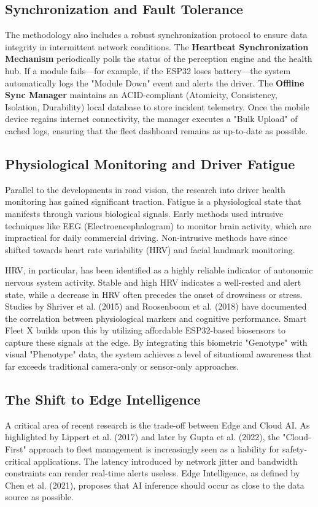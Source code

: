 \documentclass[conference]{IEEEtran}
\begin{document}
\subsection{Synchronization and Fault Tolerance}
The methodology also includes a robust synchronization protocol to ensure data integrity in intermittent network conditions. The \textbf{Heartbeat Synchronization Mechanism} periodically polls the status of the perception engine and the health hub. If a module fails—for example, if the ESP32 loses battery—the system automatically logs the "Module Down" event and alerts the driver. The \textbf{Offline Sync Manager} maintains an ACID-compliant (Atomicity, Consistency, Isolation, Durability) local database to store incident telemetry. Once the mobile device regains internet connectivity, the manager executes a "Bulk Upload" of cached logs, ensuring that the fleet dashboard remains as up-to-date as possible.

\subsection{Physiological Monitoring and Driver Fatigue}
Parallel to the developments in road vision, the research into driver health monitoring has gained significant traction. Fatigue is a physiological state that manifests through various biological signals. Early methods used intrusive techniques like EEG (Electroencephalogram) to monitor brain activity, which are impractical for daily commercial driving. Non-intrusive methods have since shifted towards heart rate variability (HRV) and facial landmark monitoring.

HRV, in particular, has been identified as a highly reliable indicator of autonomic nervous system activity. Stable and high HRV indicates a well-rested and alert state, while a decrease in HRV often precedes the onset of drowsiness or stress. Studies by Shriver et al. (2015) and Roosenboom et al. (2018) have documented the correlation between physiological markers and cognitive performance. Smart Fleet X builds upon this by utilizing affordable ESP32-based biosensors to capture these signals at the edge. By integrating this biometric "Genotype" with visual "Phenotype" data, the system achieves a level of situational awareness that far exceeds traditional camera-only or sensor-only approaches.

\subsection{The Shift to Edge Intelligence}
A critical area of recent research is the trade-off between Edge and Cloud AI. As highlighted by Lippert et al. (2017) and later by Gupta et al. (2022), the "Cloud-First" approach to fleet management is increasingly seen as a liability for safety-critical applications. The latency introduced by network jitter and bandwidth constraints can render real-time alerts useless. Edge Intelligence, as defined by Chen et al. (2021), proposes that AI inference should occur as close to the data source as possible.
\end{document}
